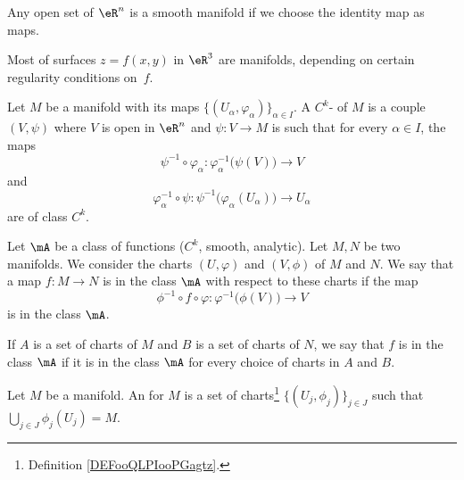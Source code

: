 \begin{example}
    Any open set of $\eR^n$ is a smooth manifold if we choose the identity map as maps.
\end{example} 

Most of surfaces $z=f(x,y)$ in $\eR^3$ are manifolds, depending on certain regularity conditions on~$f$.

\begin{definition}       \label{DEFooQLPIooPGagtz}
    Let \( M\) be a manifold with its maps \(  \{ (U_{\alpha}, \varphi_{\alpha}) \}_{\alpha\in I}   \). A \( C^k\)- of \( M\) is a couple \( (V,\psi)\) where \( V\) is open in \( \eR^n\) and \( \psi\colon V\to M\) is such that for every \( \alpha\in I\), the maps
    \begin{equation}
        \psi^{-1}\circ \varphi_{\alpha}\colon \varphi_{\alpha}^{-1}\big( \psi(V) \big)\to V
    \end{equation}
    and
    \begin{equation}
        \varphi_{\alpha}^{-1}\circ \psi\colon \psi^{-1}\big( \varphi_{\alpha}(U_{\alpha}) \big)\to U_{\alpha}
    \end{equation}
    are of class \( C^k\).
\end{definition}

\begin{definition}       \label{DEFooUFHTooTXUVpN}
    Let \( \mA\) be a class of functions (\( C^k\), smooth, analytic). Let \( M,N\) be two manifolds. We consider the charts \( (U,\varphi)\) and \( (V,\phi)\) of \( M\) and \( N\). We say that a map \(f\colon M\to N \) is in the class \( \mA\) with respect to these charts if the map
    \begin{equation}
        \phi^{-1}\circ f\circ\varphi\colon \varphi^{-1}\big( \phi(V) \big)\to V
    \end{equation}
    is in the class \( \mA\).

    If \( A\) is a set of charts of \( M\) and \( B\) is a set of charts of \( N\), we say that \( f\) is in the class \( \mA\) if it is in the class \( \mA\) for every choice of charts in \( A\) and \( B\).
\end{definition}

\begin{definition}       \label{DEFooMLNQooEgEfdq}
    Let \( M\) be a manifold. An  for \( M\) is a set of charts\footnote{Definition \ref{DEFooQLPIooPGagtz}.} \( \{  (U_j,\phi_j)  \}_{j\in J}\) such that \( \bigcup_{j\in J}\phi_j(U_j)=M\).
\end{definition}

